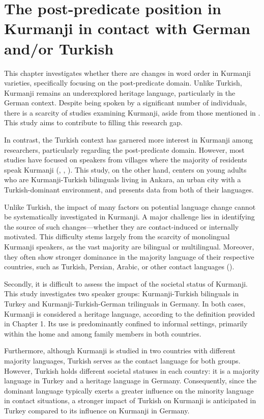 \chapter[The post-predicate position in Kurmanji in contact]{The post-predicate position in Kurmanji in contact with German and/or Turkish}\label{chap:key:6}

This chapter investigates whether there are changes in word order in Kurmanji varieties, specifically focusing on the post-predicate domain. Unlike Turkish, Kurmanji remains an underexplored heritage language, particularly in the German context. Despite being spoken by a significant number of individuals, there is a scarcity of studies examining Kurmanji, aside from those mentioned in . This study aims to contribute to filling this research gap.

In contrast, the Turkish context has garnered more interest in Kurmanji among researchers, particularly regarding the post-predicate domain. However, most studies have focused on speakers from villages where the majority of residents speak Kurmanji (\citealt{Dorleijn1996, Dorleijn2006}, \citealt{Haig2014}, \citealt{Haig2018, Gundogdu2019}). This study, on the other hand, centers on young adults who are Kurmanji-Turkish bilinguals living in Ankara, an urban city with a Turkish-dominant environment, and presents data from both of their languages.

Unlike Turkish, the impact of many factors on potential language change cannot be systematically investigated in Kurmanji. A major challenge lies in identifying the source of such changes—whether they are contact-induced or internally motivated. This difficulty stems largely from the scarcity of monolingual Kurmanji speakers, as the vast majority are bilingual or multilingual. Moreover, they often show stronger dominance in the majority language of their respective countries, such as Turkish, Persian, Arabic, or other contact languages (\citealt{BrizicnodateEtAl}).

Secondly, it is difficult to assess the impact of the societal status of Kurmanji. This study investigates two speaker groups: Kurmanji-Turkish bilinguals in Turkey and Kurmanji-Turkish-German trilinguals in Germany. In both cases, Kurmanji is considered a heritage language, according to the definition provided in Chapter 1. Its use is predominantly confined to informal settings, primarily within the home and among family members in both countries.

Furthermore, although Kurmanji is studied in two countries with different majority languages, Turkish serves as the contact language for both groups. However, Turkish holds different societal statuses in each country: it is a majority language in Turkey and a heritage language in Germany. Consequently, since the dominant language typically exerts a greater influence on the minority language in contact situations, a stronger impact of Turkish on Kurmanji is anticipated in Turkey compared to its influence on Kurmanji in Germany.

